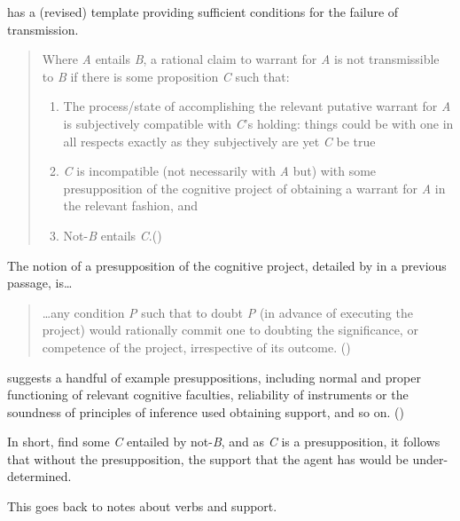 \documentclass[10pt]{article}
\begin{document}
\begin{note}
  \textcite{Wright:2011wn} has a (revised) template providing sufficient conditions for the failure of transmission.

  \begin{quote}
    Where \emph{A} entails \emph{B}, a rational claim to warrant for \emph{A} is not transmissible to \emph{B} if there is some proposition \emph{C} such that:

    \begin{enumerate}[label=(\roman*), ref=(\roman*)]
    \item\label{Wright:revised-template:1} The process/state of accomplishing the relevant putative warrant for \emph{A} is subjectively compatible with \emph{C}'s holding: things could be with one in all respects exactly as they subjectively are yet \emph{C} be true
    \item\label{Wright:revised-template:2} \emph{C} is incompatible (not necessarily with \emph{A} but) with some presupposition of the cognitive project of obtaining a warrant for \emph{A} in the relevant fashion, and
    \item\label{Wright:revised-template:3} Not-\emph{B} entails \emph{C}.\hfill\mbox{(\citeyear[93--94]{Wright:2011wn})}
    \end{enumerate}
  \end{quote}

  The notion of a presupposition of the cognitive project, detailed by \citeauthor{Wright:2011wn} in a previous passage, is\dots
  \begin{quote}
    \dots any condition \emph{P} such that to doubt \emph{P} (in advance of executing the project) would rationally commit one to doubting the significance, or competence of the project, irrespective of its outcome.\newline
    \mbox{}\hfill\mbox{(\citeyear[92]{Wright:2011wn})}
  \end{quote}
  \citeauthor{Wright:2011wn} suggests a handful of example presuppositions, including normal and proper functioning of relevant cognitive faculties, reliability of instruments or the soundness of principles of inference used obtaining support, and so on. (\citeyear[92--93]{Wright:2011wn})

  In short, find some \emph{C} entailed by not-\emph{B}, and as \emph{C} is a presupposition, it follows that without the presupposition, the support that the agent has would be under-determined.

  {
    \color{red}
    This goes back to notes about verbs and support.
  }
\end{note}
\end{document}
